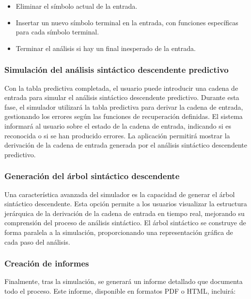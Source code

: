 \begin{itemize}
  \item Eliminar el símbolo actual de la entrada.
  \item Insertar un nuevo símbolo terminal en la entrada, con funciones específicas para cada símbolo terminal.
  \item Terminar el análisis si hay un final inesperado de la entrada.
\end{itemize}

\subsubsection{Simulación del análisis sintáctico descendente  predictivo}

Con la tabla predictiva completada, el usuario puede introducir una cadena de entrada para simular el análisis sintáctico descendente predictivo. Durante esta fase, el simulador utilizará la tabla predictiva para derivar la cadena de entrada, gestionando los errores según las funciones de recuperación definidas. El sistema informará al usuario sobre el estado de la cadena de entrada, indicando si es reconocida o si se han producido errores. La aplicación permitirá mostrar la derivación de la cadena de entrada generada por el análisis sintáctico descendente predictivo.

\subsubsection{Generación del árbol sintáctico descendente}

Una característica avanzada del simulador es la capacidad de generar el árbol sintáctico descendente. Esta opción permite a los usuarios visualizar la estructura jerárquica de la derivación de la cadena de entrada en tiempo real, mejorando su comprensión del proceso de análisis sintáctico. El árbol sintáctico se construye de forma paralela a la simulación, proporcionando una representación gráfica de cada paso del análisis.

\subsubsection{Creación de informes}

Finalmente, tras la simulación, se generará un informe detallado que documenta todo el proceso. Este informe, disponible en formatos PDF o HTML, incluirá:

